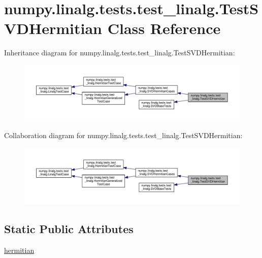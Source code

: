 \hypertarget{classnumpy_1_1linalg_1_1tests_1_1test__linalg_1_1TestSVDHermitian}{}\section{numpy.\+linalg.\+tests.\+test\+\_\+linalg.\+Test\+S\+V\+D\+Hermitian Class Reference}
\label{classnumpy_1_1linalg_1_1tests_1_1test__linalg_1_1TestSVDHermitian}


Inheritance diagram for numpy.\+linalg.\+tests.\+test\+\_\+linalg.\+Test\+S\+V\+D\+Hermitian\+:
\nopagebreak
\begin{figure}[H]
\begin{center}
\leavevmode
\includegraphics[width=350pt]{classnumpy_1_1linalg_1_1tests_1_1test__linalg_1_1TestSVDHermitian__inherit__graph}
\end{center}
\end{figure}


Collaboration diagram for numpy.\+linalg.\+tests.\+test\+\_\+linalg.\+Test\+S\+V\+D\+Hermitian\+:
\nopagebreak
\begin{figure}[H]
\begin{center}
\leavevmode
\includegraphics[width=350pt]{classnumpy_1_1linalg_1_1tests_1_1test__linalg_1_1TestSVDHermitian__coll__graph}
\end{center}
\end{figure}
\subsection*{Static Public Attributes}
\begin{DoxyCompactItemize}
\item 
\hyperlink{classnumpy_1_1linalg_1_1tests_1_1test__linalg_1_1TestSVDHermitian_ac7443c7388da03bfe7128cf187b88269}{hermitian}
\end{DoxyCompactItemize}
